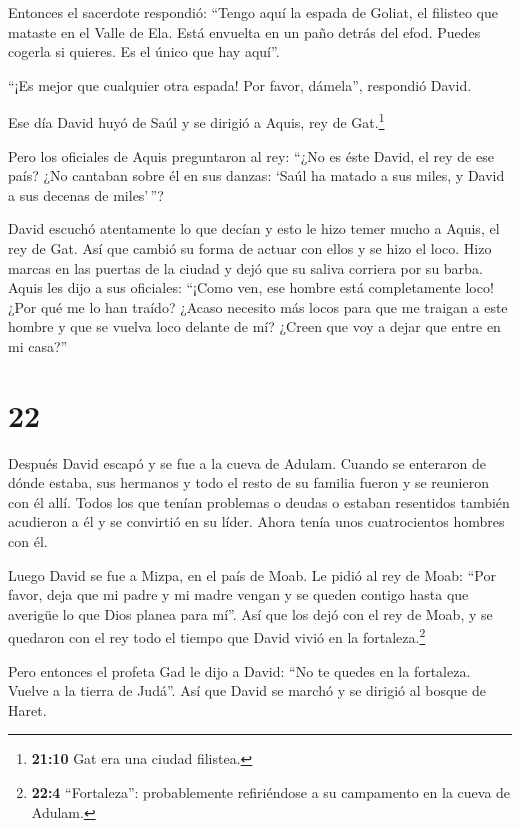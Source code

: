  Entonces el sacerdote respondió: ``Tengo aquí la espada de
Goliat, el filisteo que mataste en el Valle de Ela. Está envuelta en un
paño detrás del efod. Puedes cogerla si quieres. Es el único que hay
aquí''.

``¡Es mejor que cualquier otra espada! Por favor, dámela'', respondió
David.

 Ese día David huyó de Saúl y se dirigió a Aquis, rey de
Gat.\footnote{\textbf{21:10} Gat era una ciudad filistea.}

 Pero los oficiales de Aquis preguntaron al rey: ``¿No es
éste David, el rey de ese país? ¿No cantaban sobre él en sus danzas:
`Saúl ha matado a sus miles, y David a sus decenas de miles'\,''?

 David escuchó atentamente lo que decían y esto le hizo
temer mucho a Aquis, el rey de Gat.  Así que cambió su
forma de actuar con ellos y se hizo el loco. Hizo marcas en las puertas
de la ciudad y dejó que su saliva corriera por su barba. 
Aquis les dijo a sus oficiales: ``¡Como ven, ese hombre está
completamente loco! ¿Por qué me lo han traído?  ¿Acaso
necesito más locos para que me traigan a este hombre y que se vuelva
loco delante de mí? ¿Creen que voy a dejar que entre en mi casa?''

\hypertarget{section-21}{%
\section{22}\label{section-21}}

 Después David escapó y se fue a la cueva de Adulam. Cuando
se enteraron de dónde estaba, sus hermanos y todo el resto de su familia
fueron y se reunieron con él allí.  Todos los que tenían
problemas o deudas o estaban resentidos también acudieron a él y se
convirtió en su líder. Ahora tenía unos cuatrocientos hombres con él.

 Luego David se fue a Mizpa, en el país de Moab. Le pidió al
rey de Moab: ``Por favor, deja que mi padre y mi madre vengan y se
queden contigo hasta que averigüe lo que Dios planea para mí''.
 Así que los dejó con el rey de Moab, y se quedaron con el
rey todo el tiempo que David vivió en la fortaleza.\footnote{\textbf{22:4}
  ``Fortaleza'': probablemente refiriéndose a su campamento en la cueva
  de Adulam.}

 Pero entonces el profeta Gad le dijo a David: ``No te
quedes en la fortaleza. Vuelve a la tierra de Judá''. Así que David se
marchó y se dirigió al bosque de Haret.

